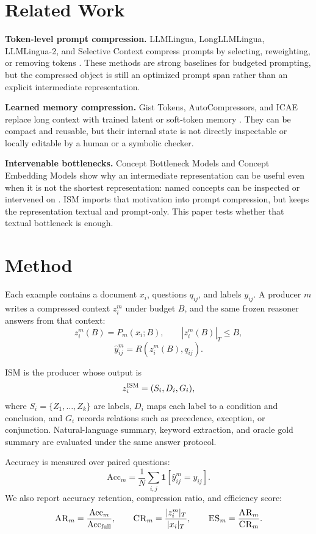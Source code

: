 \documentclass[10pt,twocolumn]{article}
\newcommand{\ism}{\textsc{ISM}}
\newcommand{\ar}{\textsc{AR}}
\newcommand{\cratio}{\textsc{CR}}
\newcommand{\es}{\textsc{ES}}
\begin{document}
\section{Related Work}

\textbf{Token-level prompt compression.}
LLMLingua, LongLLMLingua, LLMLingua-2, and Selective Context compress prompts by
selecting, reweighting, or removing tokens
\citep{jiang2023llmlingua,jiang2023longllmlingua,pan2024llmlingua2,li2023selective}.
These methods are strong baselines for budgeted prompting, but the compressed
object is still an optimized prompt span rather than an explicit intermediate
representation.

\textbf{Learned memory compression.}
Gist Tokens, AutoCompressors, and ICAE replace long context with trained latent
or soft-token memory \citep{mu2023gist,chevalier2023autocompressors,ge2024icae}.
They can be compact and reusable, but their internal state is not directly
inspectable or locally editable by a human or a symbolic checker.

\textbf{Intervenable bottlenecks.}
Concept Bottleneck Models and Concept Embedding Models show why an intermediate
representation can be useful even when it is not the shortest representation:
named concepts can be inspected or intervened on
\citep{koh2020concept,espinosa2022concept}.  \ism{} imports that motivation into
prompt compression, but keeps the representation textual and prompt-only.  This
paper tests whether that textual bottleneck is enough.

\section{Method}

Each example contains a document $x_i$, questions $q_{ij}$, and labels
$y_{ij}$.  A producer $m$ writes a compressed context $z_i^m$ under budget $B$,
and the same frozen reasoner answers from that context:
\[
z_i^m(B)=P_m(x_i;B), \qquad |z_i^m(B)|_T \le B,
\]
\[
\hat y_{ij}^m = R\!\left(z_i^m(B), q_{ij}\right).
\]

\ism{} is the producer whose output is
\[
z_i^{\ism}=(S_i,D_i,G_i),
\]
where $S_i=\{Z_1,\ldots,Z_k\}$ are labels, $D_i$ maps each label to a condition
and conclusion, and $G_i$ records relations such as precedence, exception, or
conjunction.  Natural-language summary, keyword extraction, and oracle gold
summary are evaluated under the same answer protocol.

Accuracy is measured over paired questions:
\[
\mathrm{Acc}_m=\frac{1}{N}\sum_{i,j}\mathbf{1}\!\left[\hat y_{ij}^m=y_{ij}\right].
\]
We also report accuracy retention, compression ratio, and efficiency score:
\[
\ar_m=\frac{\mathrm{Acc}_m}{\mathrm{Acc}_{\mathrm{full}}}, \qquad
\cratio_m=\frac{|z_i^m|_T}{|x_i|_T}, \qquad
\es_m=\frac{\ar_m}{\cratio_m}.
\]
\end{document}
